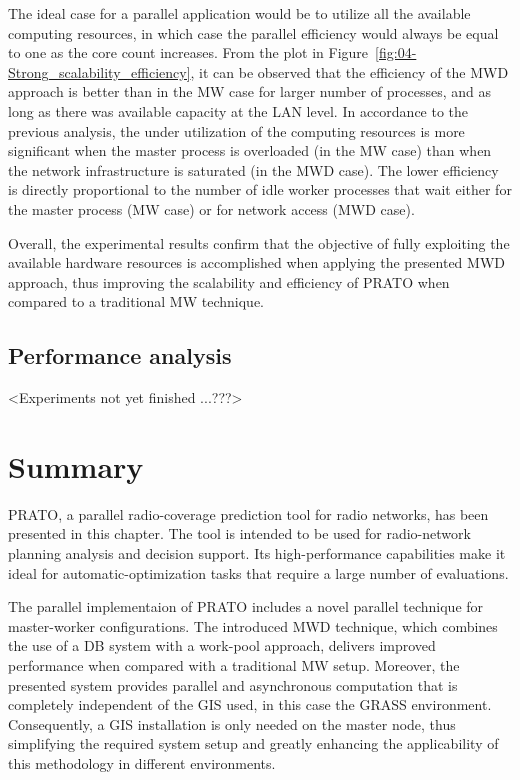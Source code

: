 The ideal case for a parallel application would be to utilize all
the available computing resources, in which case the parallel efficiency
would always be equal to one as the core count increases. From the
plot in Figure~\ref{fig:04-Strong_scalability_efficiency}, it can
be observed that the efficiency of the MWD approach is better than
in the MW case for larger number of processes, and as long as there
was available capacity at the LAN level. In accordance to the previous
analysis, the under utilization of the computing resources is more
significant when the master process is overloaded (in the MW case)
than when the network infrastructure is saturated (in the MWD case).
The lower efficiency is directly proportional to the number of idle
worker processes that wait either for the master process (MW case)
or for network access (MWD case).

Overall, the experimental results confirm that the objective of fully
exploiting the available hardware resources is accomplished when applying
the presented MWD approach, thus improving the scalability and efficiency
of PRATO when compared to a traditional MW technique.


\subsection{Performance analysis \label{sub:04-GPU_performance}}

<Experiments not yet finished ...???>



\clearpage{}


\section{Summary \label{sec:04-Summary}}

PRATO, a parallel radio-coverage prediction tool for radio networks,
has been presented in this chapter. The tool is intended to be used
for radio-network planning analysis and decision support. Its high-performance
capabilities make it ideal for automatic-optimization tasks that require
a large number of evaluations.

The parallel implementaion of PRATO includes a novel parallel technique
for master-worker configurations. The introduced MWD technique, which
combines the use of a DB system with a work-pool approach, delivers
improved performance when compared with a traditional MW setup. Moreover,
the presented system provides parallel and asynchronous computation
that is completely independent of the GIS used, in this case the GRASS
environment. Consequently, a GIS installation is only needed on the
master node, thus simplifying the required system setup and greatly
enhancing the applicability of this methodology in different environments.

